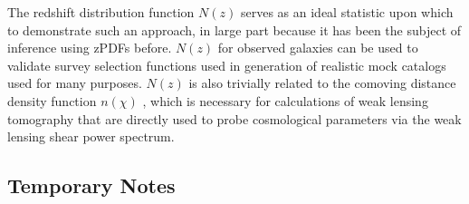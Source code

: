 \documentclass[preprint]{aastex}
\begin{document}
The redshift distribution function $N(z)$ serves as an ideal statistic upon which to demonstrate such an approach, in large part because it has been the subject of inference using zPDFs before.  \citep{she11, kel12, ben12, bon13, vii15}  $N(z)$ for observed galaxies can be used to validate survey selection functions used in generation of realistic mock catalogs used for many purposes.  \citep{nor01}  $N(z)$ is also trivially related to the comoving distance density function $n(\chi)$ \citep{hog99}, which is necessary for calculations of weak lensing tomography that are directly used to probe cosmological parameters via the weak lensing shear power spectrum.  \citep{mas15}

\clearpage
\subsection*{Temporary Notes}
\end{document}
